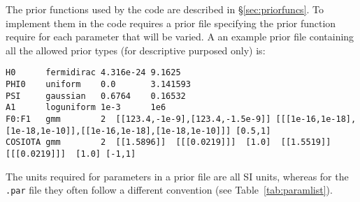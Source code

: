 The prior functions used by the code are described in \S\ref{sec:priorfuncs}. To implement them in the code requires a prior
file specifying the prior function require for each parameter that will be varied. A an example prior file containing all the
allowed prior types (for descriptive purposed only) is:
\begin{lstlisting}[frame=single]
H0      fermidirac 4.316e-24 9.1625
PHI0    uniform    0.0       3.141593
PSI     gaussian   0.6764    0.16532
A1      loguniform 1e-3      1e6
F0:F1   gmm        2  [[123.4,-1e-9],[123.4,-1.5e-9]] [[[1e-16,1e-18],[1e-18,1e-10]],[[1e-16,1e-18],[1e-18,1e-10]]] [0.5,1]
COSIOTA gmm        2  [[1.5896]]  [[[0.0219]]]  [1.0]  [[1.5519]]  [[[0.0219]]]  [1.0] [-1,1]
\end{lstlisting}
The units required for parameters in a prior file are all SI units, whereas for the {\tt .par} file they often follow a different
convention (see Table~\ref{tab:paramlist}).

